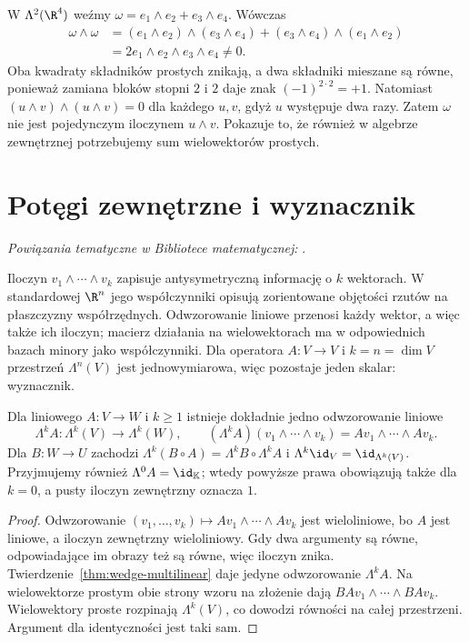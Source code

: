 \begin{przyklad}
W $\Lambda^2(\R^4)$ weźmy
$\omega=e_1\wedge e_2+e_3\wedge e_4$. Wówczas
\[
\begin{aligned}
 \omega\wedge\omega
 &=(e_1\wedge e_2)\wedge(e_3\wedge e_4)
   +(e_3\wedge e_4)\wedge(e_1\wedge e_2)\\
 &=2e_1\wedge e_2\wedge e_3\wedge e_4\ne0.
\end{aligned}
\]
Oba kwadraty składników prostych znikają, a dwa składniki
mieszane są równe, ponieważ zamiana bloków stopni $2$ i $2$
daje znak $(-1)^{2\cdot2}=+1$.
Natomiast $(u\wedge v)\wedge(u\wedge v)=0$ dla każdego
$u,v$, gdyż $u$ występuje dwa razy. Zatem $\omega$ nie
jest pojedynczym iloczynem $u\wedge v$. Pokazuje to, że
również w algebrze zewnętrznej potrzebujemy sum wielowektorów
prostych.
\end{przyklad}

\section{Potęgi zewnętrzne i wyznacznik}
\label{sec:wyznacznik}

\noindent\emph{Powiązania tematyczne w Bibliotece matematycznej:} .


Iloczyn $v_1\wedge\cdots\wedge v_k$ zapisuje
antysymetryczną informację o $k$ wektorach. W standardowej $\R^n$
jego współczynniki opisują zorientowane objętości
rzutów na płaszczyzny współrzędnych. Odwzorowanie liniowe
przenosi każdy wektor, a więc także ich iloczyn; macierz
działania na wielowektorach ma w odpowiednich bazach minory
jako współczynniki. Dla operatora
$A\colon V\to V$ i $k=n=\dim V$ przestrzeń $\Lambda^n(V)$
jest jednowymiarowa, więc pozostaje jeden skalar: wyznacznik.

\begin{twierdzenie}
\label{thm:potega-zewn-operatora}
Dla liniowego $A\colon V\to W$ i $k\geq1$ istnieje dokładnie jedno odwzorowanie
liniowe
\[
 \Lambda^k A\colon\Lambda^k(V)\to\Lambda^k(W),\qquad
 (\Lambda^k A)(v_1\wedge\cdots\wedge v_k)
 =Av_1\wedge\cdots\wedge Av_k.
\]
Dla $B\colon W\to U$ zachodzi
$\Lambda^k(B\circ A)=\Lambda^k B\circ\Lambda^k A$
i $\Lambda^k\id_V=\id_{\Lambda^k(V)}$.
Przyjmujemy również $\Lambda^0A=\id_{\mathbb K}$; wtedy powyższe
prawa obowiązują także dla $k=0$, a pusty iloczyn zewnętrzny oznacza $1$.
\end{twierdzenie}
\begin{proof}
Odwzorowanie $(v_1,\ldots,v_k)\mapsto
Av_1\wedge\cdots\wedge Av_k$ jest wieloliniowe,
bo $A$ jest liniowe, a iloczyn zewnętrzny wieloliniowy.
Gdy dwa argumenty są równe, odpowiadające im obrazy też
są równe, więc iloczyn znika. Twierdzenie~\ref{thm:wedge-multilinear}
daje jedyne odwzorowanie $\Lambda^k A$.
Na wielowektorze prostym obie strony wzoru na złożenie
dają $BA v_1\wedge\cdots\wedge BA v_k$.
Wielowektory proste rozpinają $\Lambda^k(V)$, co dowodzi
równości na całej przestrzeni. Argument dla identyczności
jest taki sam.
\end{proof}

